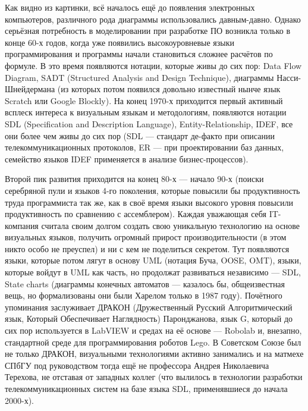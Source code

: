\documentclass[a5paper]{article}
\begin{document}
Как видно из картинки, всё началось ещё до появления электронных компьютеров, различного рода диаграммы использовались давным-давно. Однако серьёзная потребность в моделировании при разработке ПО возникла только в конце 60-х годов, когда уже появились высокоуровневые языки программирования и программы начали становиться сложнее расчётов по формуле. В это время появляются нотации, которые живы до сих пор: Data Flow Diagram, SADT (Structured Analysis and Design Technique), диаграммы Насси-Шнейдермана (из которых потом появился довольно известный нынче язык Scratch или Google Blockly). На конец 1970-х приходится первый активный всплеск интереса к визуальным языкам и методологиям, появляются нотации SDL (Specification and Description Language), Entity-Relationship, IDEF, все они более чем живы до сих пор (SDL --- стандарт де-факто при описании телекоммуникационных протоколов, ER --- при проектировании баз данных, семейство языков IDEF применяется в анализе бизнес-процессов). 

Второй пик развития приходится на конец 80-х --- начало 90-х (поиски серебряной пули и языков 4-го поколения, которые повысили бы продуктивность труда программиста так же, как в своё время языки высокого уровня повысили продуктивность по сравнению с ассемблером). Каждая уважающая себя IT-компания считала своим долгом создать свою уникальную технологию на основе визуальных языков, получить огромный прирост производительности (в этом никто особо не преуспел) и ни с кем не поделиться секретом. Тут появляются языки, которые потом лягут в основу UML (нотация Буча, OOSE, OMT), языки, которые войдут в UML как часть, но продолжат развиваться независимо --- SDL, State charts (диаграммы конечных автоматов --- казалось бы, общеизвестная вещь, но формализованы они были Харелом только в 1987 году). Почётного упоминания заслуживает ДРАКОН (Дружественный Русский Алгоритмический язык, Который Обеспечивает Наглядность) Паронджанова, язык G, который до сих пор используется в LabVIEW и средах на её основе --- Robolab и, внезапно, стандартной среде для программирования роботов Lego. В Советском Союзе был не только ДРАКОН, визуальными технологиями активно занимались и на матмехе СПбГУ под руководством тогда ещё не профессора Андрея Николаевича Терехова, не отставая от западных коллег (что вылилось в технологии разработки телекоммуникационных систем на базе языка SDL, применявшиеся до начала 2000-х).
\end{document}
